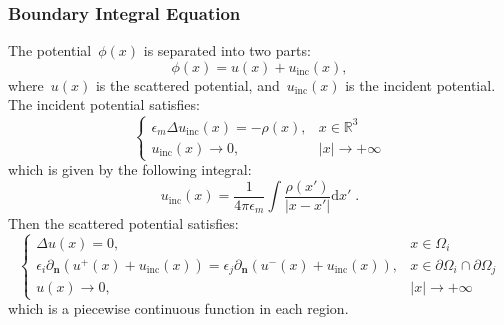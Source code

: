 \documentclass{beamer}
\newcommand{\abs}[1]{\left|#1\right|} %
\begin{document}
\begin{frame}
	\frametitle{Boundary Integral Equation}

	The potential~$\phi(x)$ is separated into two parts:
    \begin{equation}
        \phi(x) = u(x) + u_{\text{inc}}(x),
    \end{equation}
    where~$u(x)$ is the scattered potential, and~$u_{\text{inc}}(x)$ is the incident potential.
    The incident potential satisfies:
    \begin{equation}
        \begin{cases}
        \epsilon_m \Delta u_{\text{inc}}(x) = - \rho(x), & x \in \mathbb{R}^3 \\
        u_{\text{inc}}(x) \to 0, & \abs{x} \to + \infty 
        \end{cases}
    \end{equation}
    which is given by the following integral:
    \begin{equation}
        u_{\text{inc}}(x) = \frac{1}{4 \pi \epsilon_m} \int \frac{\rho(x')}{|x - x'|} \mathrm{d}x'\;.
    \end{equation}
    Then the scattered potential satisfies:
    \begin{equation}\label{eq:scattered-potential-boundary}
        \begin{cases}
        \Delta u(x) = 0, & x \in \Omega_i \\
        \epsilon_i \partial_{\mathbf{n}} \left( u^+(x) + u_{\text{inc}}(x) \right) = \epsilon_j \partial_{\mathbf{n}} \left( u^-(x) + u_{\text{inc}}(x) \right), & x \in \partial \Omega_i \cap \partial \Omega_j \\
        u(x) \to 0, & \abs{x} \to + \infty 
        \end{cases}
    \end{equation}
    which is a piecewise continuous function in each region.
\end{frame}
\end{document}
